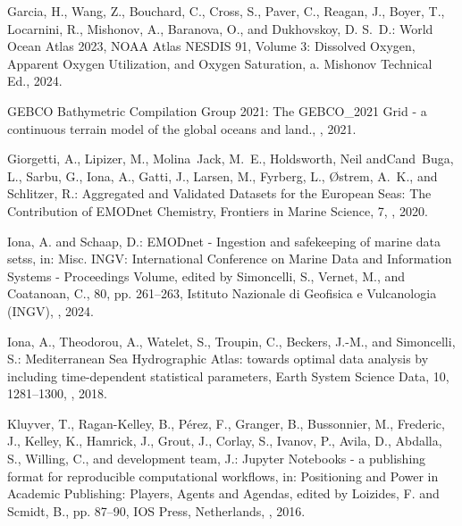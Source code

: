 \documentclass[essd, manuscript]{copernicus}
\begin{document}
\begin{thebibliography}{52}
Garcia, H., Wang, Z., Bouchard, C., Cross, S., Paver, C., Reagan, J., Boyer,
  T., Locarnini, R., Mishonov, A., Baranova, O., and Dukhovskoy, D. S.~D.:
  {World Ocean Atlas 2023}, NOAA Atlas NESDIS 91, Volume 3: Dissolved Oxygen,
  Apparent Oxygen Utilization, and Oxygen Saturation, a. Mishonov Technical
  Ed., 2024{}.

{GEBCO Bathymetric Compilation Group 2021}: The GEBCO\_2021 Grid - a continuous
  terrain model of the global oceans and land.,
  , 2021.

Giorgetti, A., Lipizer, M., Molina~Jack, M.~E., Holdsworth, Neil andCand~Buga,
  L., Sarbu, G., Iona, A., Gatti, J., Larsen, M., Fyrberg, L., Østrem, A.~K.,
  and Schlitzer, R.: {Aggregated and Validated Datasets for the European Seas:
  The Contribution of EMODnet Chemistry}, Frontiers in Marine Science, 7,
  , 2020.

Iona, A. and Schaap, D.: {EMODnet - Ingestion and safekeeping of marine data
  setss}, in: {Misc. INGV: International Conference on Marine Data and
  Information Systems - Proceedings Volume}, edited by Simoncelli, S., Vernet,
  M., and Coatanoan, C., 80, pp. 261--263, Istituto Nazionale di Geofisica e
  Vulcanologia (INGV), , 2024.

Iona, A., Theodorou, A., Watelet, S., Troupin, C., Beckers, J.-M., and
  Simoncelli, S.: Mediterranean Sea Hydrographic Atlas: towards optimal data
  analysis by including time-dependent statistical parameters, Earth System
  Science Data, 10, 1281–1300, , 2018.

Kluyver, T., Ragan-Kelley, B., P{\'e}rez, F., Granger, B., Bussonnier, M.,
  Frederic, J., Kelley, K., Hamrick, J., Grout, J., Corlay, S., Ivanov, P.,
  Avila, D., Abdalla, S., Willing, C., and development team, J.: Jupyter
  Notebooks - a publishing format for reproducible computational workflows, in:
  Positioning and Power in Academic Publishing: Players, Agents and Agendas,
  edited by Loizides, F. and Scmidt, B., pp. 87--90, IOS Press, Netherlands,
  , 2016.


\end{thebibliography}
\end{document}
